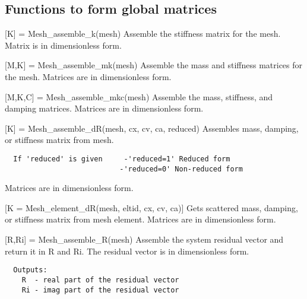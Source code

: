 \subsection{Functions to form global matrices}
\begin{codelist}

  \item[{[K]} = Mesh\_assemble\_k(mesh)]
  Assemble the stiffness matrix for the mesh.
  Matrix is in dimensionless form.

  \item[{[M,K]} = Mesh\_assemble\_mk(mesh)]
  Assemble the mass and stiffness matrices for the mesh.
  Matrices are in dimensionless form.

  \item[{[M,K,C]} = Mesh\_assemble\_mkc(mesh)]
  Assemble the mass, stiffness, and damping matrices.
  Matrices are in dimensionless form.

  \item[{[K]} = Mesh\_assemble\_dR(mesh, cx, cv, ca, reduced)]
  Assembles mass, damping, or stiffness matrix from mesh.
\begin{verbatim}
  If 'reduced' is given     -'reduced=1' Reduced form
                           -'reduced=0' Non-reduced form
\end{verbatim}
  Matrices are in dimensionless form.

  \item[[K] = Mesh\_element\_dR(mesh, eltid, cx, cv, ca)]
  Gets scattered mass, damping, or stiffness matrix from mesh element.
  Matrices are in dimensionless form.

  \item[{[R,Ri] = Mesh\_assemble\_R(mesh)}]
  Assemble the system residual vector and return it in R and Ri.
  The residual vector is in dimensionless form.
\begin{verbatim}
  Outputs:
    R  - real part of the residual vector
    Ri - imag part of the residual vector
\end{verbatim}

\end{codelist}

